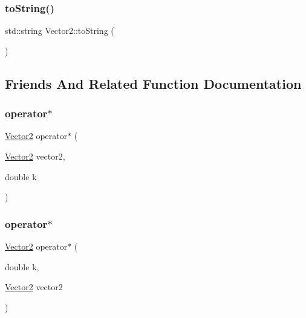 \mbox{\label{struct_vector2_abcf7d729573613553822f965c3b9a3d2}} 
\subsubsection{\texorpdfstring{to\+String()}{toString()}}
{\footnotesize\ttfamily std\+::string Vector2\+::to\+String (\begin{DoxyParamCaption}{ }\end{DoxyParamCaption})}



\subsection{Friends And Related Function Documentation}
\mbox{\label{struct_vector2_a489f5283f5f1dc905c57d0a40d98c1af}} 
\subsubsection{\texorpdfstring{operator$\ast$}{operator*}\hspace{0.1cm}{\footnotesize\ttfamily [1/2]}}
{\footnotesize\ttfamily \mbox{\hyperlink{struct_vector2}{Vector2}} operator$\ast$ (\begin{DoxyParamCaption}\item[{\mbox{\hyperlink{struct_vector2}{Vector2}}}]{vector2,  }\item[{double}]{k }\end{DoxyParamCaption})\hspace{0.3cm}{\ttfamily [friend]}}

\mbox{\label{struct_vector2_a6ac6360b23e2a1457b794f0aefc18f3a}} 
\subsubsection{\texorpdfstring{operator$\ast$}{operator*}\hspace{0.1cm}{\footnotesize\ttfamily [2/2]}}
{\footnotesize\ttfamily \mbox{\hyperlink{struct_vector2}{Vector2}} operator$\ast$ (\begin{DoxyParamCaption}\item[{double}]{k,  }\item[{\mbox{\hyperlink{struct_vector2}{Vector2}}}]{vector2 }\end{DoxyParamCaption})\hspace{0.3cm}{\ttfamily [friend]}}



